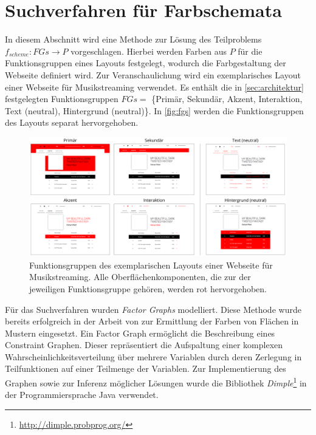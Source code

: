 \section{Suchverfahren für Farbschemata}
\label{sec:farbschema}

In diesem Abschnitt wird eine Methode zur Lösung des Teilproblems $f_{scheme}: FGs \to P$ vorgeschlagen. Hierbei werden Farben aus $P$ für die Funktionsgruppen eines Layouts festgelegt, wodurch die Farbgestaltung der Webseite definiert wird. Zur Veranschaulichung wird ein exemplarisches Layout einer Webseite für Musikstreaming verwendet. Es enthält die in \autoref{sec:architektur} festgelegten Funktionsgruppen $FGs = $ \{Primär, Sekundär, Akzent, Interaktion, Text (neutral), Hintergrund (neutral)\}. In \autoref{fig:fgs} werden die Funktionsgruppen des Layouts separat hervorgehoben.

\begin{figure}[h]
\centering
\includegraphics[width=1\textwidth]{img/fgs.png}
\caption{Funktionsgruppen des exemplarischen Layouts einer  Webseite für Musikstreaming. Alle Oberflächenkomponenten, die zur der jeweiligen Funktionsgruppe gehören, werden rot hervorgehoben.}
\label{fig:fgs}
\end{figure}

Für das Suchverfahren wurden \emph{Factor Graphs} modelliert. Diese Methode wurde bereits erfolgreich in der Arbeit von \citet{magazines} zur Ermittlung der Farben von Flächen in Mustern eingesetzt. Ein Factor Graph ermöglicht die Beschreibung eines Constraint Graphen. Dieser repräsentiert die Aufspaltung einer komplexen Wahrscheinlichkeitsverteilung über mehrere Variablen durch deren Zerlegung in Teilfunktionen auf einer Teilmenge der Variablen. Zur Implementierung des Graphen sowie zur Inferenz möglicher Lösungen wurde die Bibliothek \emph{Dimple}\footnote{\url{http://dimple.probprog.org/}} in der Programmiersprache Java verwendet.

